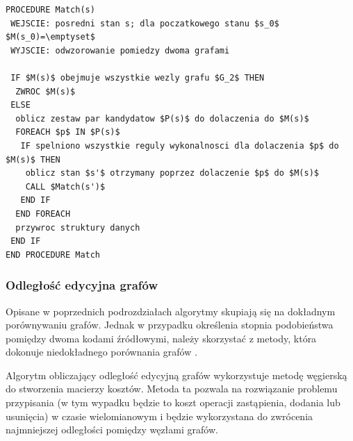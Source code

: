\documentclass[a4paper,12pt,twoside]{article}
\begin{document}
\begin{lstlisting}[mathescape, caption={Pseudokod algorytmu VF2.}, label={lst:vf2}]
PROCEDURE Match(s)
 WEJSCIE: posredni stan s; dla poczatkowego stanu $s_0$ $M(s_0)=\emptyset$
 WYJSCIE: odwzorowanie pomiedzy dwoma grafami
 
 IF $M(s)$ obejmuje wszystkie wezly grafu $G_2$ THEN
  ZWROC $M(s)$
 ELSE
  oblicz zestaw par kandydatow $P(s)$ do dolaczenia do $M(s)$
  FOREACH $p$ IN $P(s)$
   IF spelniono wszystkie reguly wykonalnosci dla dolaczenia $p$ do $M(s)$ THEN
    oblicz stan $s'$ otrzymany poprzez dolaczenie $p$ do $M(s)$
    CALL $Match(s')$
   END IF
  END FOREACH
  przywroc struktury danych
 END IF
END PROCEDURE Match
\end{lstlisting}

\newpage

\subsubsection{Odległość edycyjna grafów}

Opisane w poprzednich podrozdziałach algorytmy skupiają się na dokładnym porównywaniu grafów. Jednak w przypadku określenia stopnia podobieństwa pomiędzy dwoma kodami źródłowymi, należy skorzystać z metody, która dokonuje niedokładnego porównania grafów \cite{inexact}\cite{inexact2}.

Algorytm obliczający odległość edycyjną grafów wykorzystuje metodę węgierską \cite{hun} do stworzenia macierzy kosztów. Metoda ta pozwala na rozwiązanie problemu przypisania (w tym wypadku będzie to koszt operacji zastąpienia, dodania lub usunięcia) w czasie wielomianowym i będzie wykorzystana do zwrócenia najmniejszej odległości pomiędzy węzłami grafów. 
\end{document}
